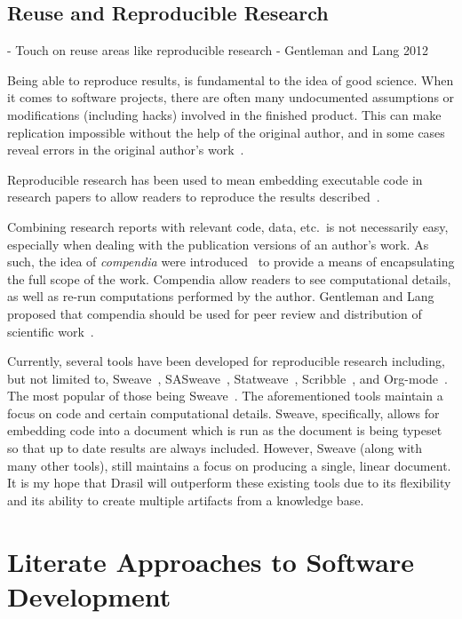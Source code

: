 \subsection{Reuse and Reproducible Research}
  - Touch on reuse areas like reproducible research - Gentleman and Lang 2012

Being able to reproduce results, is fundamental to the idea of good science.
When it comes to software projects, there are often many undocumented
assumptions or modifications (including hacks) involved in the finished product.
This can make replication impossible without the help of the original author,
and in some cases reveal errors in the original author's
work~\cite{IonescuAndJansson2013}.

Reproducible research has been used to mean embedding executable code in
research papers to allow readers to reproduce the results
described~\cite{SchulteEtAl2012}.

Combining research reports with relevant code, data, etc.\ is not necessarily
easy, especially when dealing with the publication versions of an author's work.
As such, the idea of \emph{compendia} were
introduced~\cite{GentlemanAndLang2012} to provide a means of encapsulating the
full scope of the work. Compendia allow readers to see computational details, as
well as re-run computations performed by the author. Gentleman and Lang proposed
that compendia should be used for peer review and distribution of scientific
work~\cite{GentlemanAndLang2012}.

Currently, several tools have been developed for reproducible research
including, but not limited to, Sweave~\cite{Leisch2002},
SASweave~\cite{LenthEtAl2007}, Statweave~\cite{Lenth2009},
Scribble~\cite{FlattEtAl2009}, and Org-mode~\cite{SchulteEtAl2012}. The most
popular of those being Sweave~\cite{SchulteEtAl2012}. The aforementioned tools
maintain a focus on code and certain computational details. Sweave,
specifically, allows for embedding code into a document which is run as the
document is being typeset so that up to date results are always included.
However, Sweave (along with many other tools), still maintains a focus on
producing a single, linear document. It is my hope that Drasil will outperform
these existing tools due to its flexibility and its ability to create multiple
artifacts from a knowledge base.

\section{Literate Approaches to Software Development}

